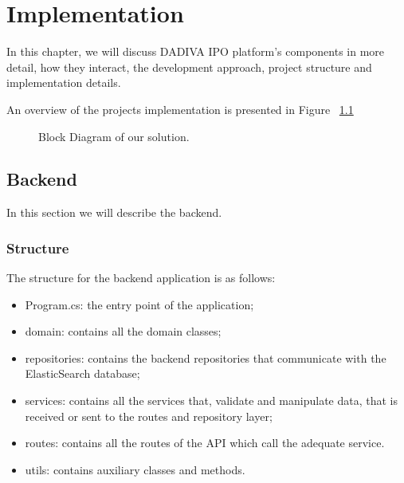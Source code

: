 \chapter{Implementation} \label{cap:implementation}

In this chapter, we will discuss DADIVA IPO platform's components in more detail, how they interact, the development approach, project structure and implementation details.

An overview of the projects implementation is presented in Figure ~\ref{fig:Block_Diagram}

\begin{figure}[H]
	\begin{center}
	\end{center}
	\caption{Block Diagram of our solution.}\label{fig:Block_Diagram}
\end{figure}

\section{Backend} \label{backend}
In this section we will describe the backend.

\subsection{Structure}

The structure for the backend application is as follows:

\begin{itemize}
 \item Program.cs: the entry point of the application;
 \item domain: contains all the domain classes;
 \item repositories: contains the backend repositories that communicate with the ElasticSearch database;
 \item services: contains all the services that, validate and manipulate data, that is received or sent to the routes and repository layer;
 \item routes: contains all the routes of the API which call the adequate service.
 \item utils: contains auxiliary classes and methods.
\end{itemize}

